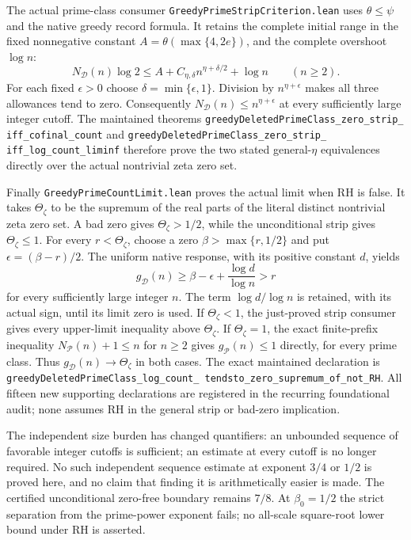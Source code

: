 \documentclass[11pt]{article}
\theoremstyle{definition}
\begin{document}
The actual prime-class consumer
\texttt{GreedyPrimeStripCriterion.lean} uses $\theta\le\psi$
and the native greedy record formula.
It retains the complete initial range in the fixed nonnegative constant
$A=\theta(\max\{4,2e\})$, and the complete overshoot $\log n$:
\[
 N_{\mathcal D}(n)\log2
 \le A+C_{\eta,\delta}n^{\eta+\delta/2}+\log n
 \qquad(n\ge2).
\]
For each fixed $\epsilon>0$ choose $\delta=\min\{\epsilon,1\}$.
Division by $n^{\eta+\epsilon}$ makes all three allowances tend to
zero.  Consequently $N_{\mathcal D}(n)\le n^{\eta+\epsilon}$
at every sufficiently large integer cutoff.
The maintained theorems
\texttt{greedyDeletedPrimeClass\_\allowbreak zero\_\allowbreak strip\_\allowbreak
iff\_\allowbreak cofinal\_\allowbreak count} and
\texttt{greedyDeletedPrimeClass\_\allowbreak zero\_\allowbreak strip\_\allowbreak
iff\_\allowbreak log\_\allowbreak count\_\allowbreak liminf}
therefore prove the two stated general-$\eta$ equivalences directly
over the actual nontrivial zeta zero set.

Finally \texttt{GreedyPrimeCountLimit.lean} proves the actual limit
when RH is false.
It takes $\Theta_\zeta$ to be the supremum of the real parts of the
literal distinct nontrivial zeta zero set.
A bad zero gives $\Theta_\zeta>1/2$, while the unconditional strip
gives $\Theta_\zeta\le1$.
For every $r<\Theta_\zeta$, choose a zero
$\beta>\max\{r,1/2\}$ and put $\epsilon=(\beta-r)/2$.
The uniform native response, with its positive constant $d$, yields
\[
 g_{\mathcal D}(n)\ge
 \beta-\epsilon+\frac{\log d}{\log n}>r
\]
for every sufficiently large integer $n$.
The term $\log d/\log n$ is retained, with its actual sign, until
its limit zero is used.
If $\Theta_\zeta<1$, the just-proved strip consumer gives every
upper-limit inequality above $\Theta_\zeta$.
If $\Theta_\zeta=1$, the exact finite-prefix inequality
$N_{\mathcal P}(n)+1\le n$ for $n\ge2$ gives
$g_{\mathcal P}(n)\le1$ directly, for every prime class.
Thus $g_{\mathcal D}(n)\to\Theta_\zeta$ in both cases.
The exact maintained declaration is
\texttt{greedyDeletedPrimeClass\_\allowbreak log\_\allowbreak count\_\allowbreak
tendsto\_\allowbreak zero\_\allowbreak supremum\_\allowbreak of\_\allowbreak not\_\allowbreak RH}.
All fifteen new supporting declarations are registered in the recurring
foundational audit; none assumes RH in the general strip or bad-zero
implication.

The independent size burden has changed quantifiers: an unbounded sequence
of favorable integer cutoffs is sufficient; an estimate at every cutoff
is no longer required.
No such independent sequence estimate at exponent $3/4$ or $1/2$
is proved here, and no claim that finding it is arithmetically easier
is made. The certified unconditional zero-free boundary remains $7/8$.
At $\beta_0=1/2$ the strict separation from the prime-power exponent
fails; no all-scale square-root lower bound under RH is asserted.
\end{document}
